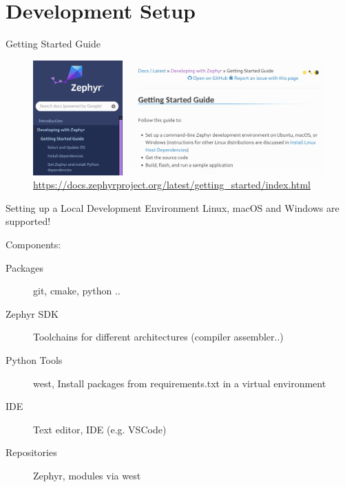 \documentclass[10pt, aspectratio=169]{beamer}
\begin{document}
\section{Development Setup}
\begin{frame}[fragile]{Getting Started Guide}
  \begin{figure}
    \includegraphics[width=\textwidth]{images/zephyr_getting_started.png}
    \caption*{\scriptsize\href{https://docs.zephyrproject.org/latest/getting_started/index.html}{https://docs.zephyrproject.org/latest/getting\_started/index.html}}
  \end{figure}
\end{frame}
\begin{frame}[fragile]{Setting up a Local Development Environment}
Linux, macOS and Windows \footnotemark  are supported!

Components:
  \begin{description}
    \item [Packages] git, cmake, python ..
    \item [Zephyr SDK] Toolchains for different architectures (compiler assembler..)
    \item [Python Tools] west, Install packages from requirements.txt in a virtual environment
    \item [IDE] Text editor, IDE (e.g. VSCode)
    \item [Repositories] Zephyr, modules via west
  \end{description}
\end{frame}
\end{document}

